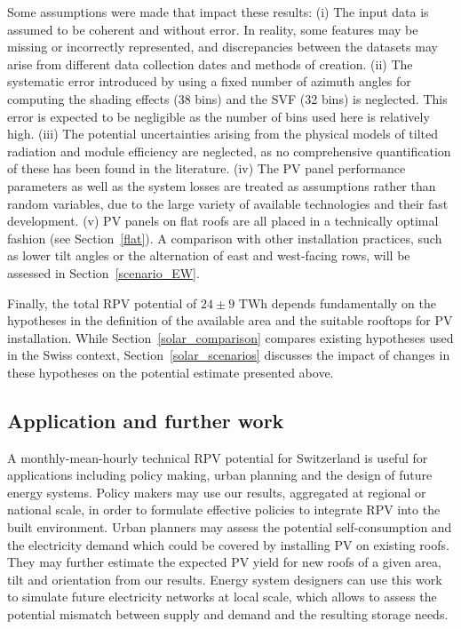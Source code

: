 Some assumptions were made that impact these results:
(i) The input data is assumed to be coherent and without error. In reality, some features may be missing or incorrectly represented, and discrepancies between the datasets may arise from  different data collection dates and methods of creation.
(ii) The systematic error introduced by using a fixed number of azimuth angles for computing the shading effects (38 bins) and the SVF (32 bins) is neglected. This error is expected to be negligible as the number of bins used here is relatively high.
(iii) The potential uncertainties arising from the physical models of tilted radiation and module efficiency are neglected, as no comprehensive quantification of these has been found in the literature.
(iv) The PV panel performance parameters as well as the system losses are treated as assumptions rather than random variables, due to the large variety of available technologies and their fast development. 
(v) PV panels on flat roofs are all placed in a technically optimal fashion (see Section~\ref{flat}). 
A comparison with other installation practices, such as lower tilt angles or the alternation of east and west-facing rows, will be assessed in Section~\ref{scenario_EW}.

Finally, the total RPV potential of $24 \pm 9$ TWh depends fundamentally on the hypotheses in the definition of the available area and the suitable rooftops for PV installation. While Section~\ref{solar_comparison} compares existing hypotheses used in the Swiss context, Section~\ref{solar_scenarios} discusses the impact of changes in these hypotheses on the potential estimate presented above.


\subsection{Application and further work}
\label{application_pv}
A monthly-mean-hourly technical RPV potential for Switzerland is useful for applications including policy making, urban planning and the design of future energy systems. 
Policy makers may use our results, aggregated at regional or national scale, in order to formulate effective policies to integrate RPV into the built environment. 
Urban planners may assess the potential self-consumption and the electricity demand which could be covered by installing PV on existing roofs. They may further estimate the expected PV yield for new roofs of a given area, tilt and orientation from our results. 
Energy system designers can use this work to simulate future electricity networks at local scale, which allows to assess the potential mismatch between supply and demand and the resulting storage needs. 

